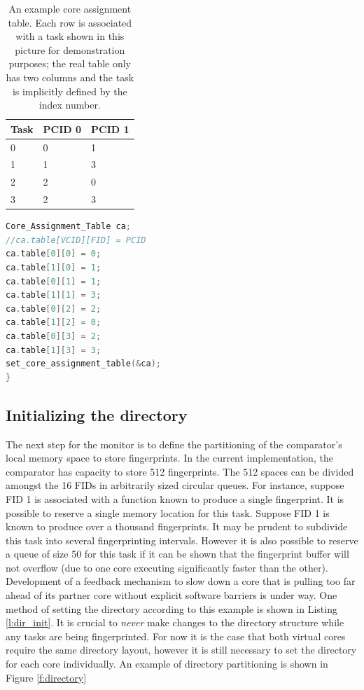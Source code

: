 \begin{table}
\centering
    \begin{tabular}{| l | l | l  |}
    \hline
    Task & PCID 0 & PCID 1\\ \hline
    0 & 0 & 1\\ \hline
    1 & 1 & 3\\ \hline
    2 & 2 & 0\\ \hline
    3 & 2 & 3\\ \hline
    \end{tabular}
    \caption[An example core assignment table.]{An example core assignment table. Each row is associated with a task shown in this picture for demonstration purposes; the real table only has two columns and the task is implicitly defined by the index number. }
    \label{t:cat}
\end{table}


\begin{lstlisting}[frame=single,language=C,label=l:cat,caption=The monitor programs the CAT in the comparator.]
Core_Assignment_Table ca;
//ca.table[VCID][FID] = PCID
ca.table[0][0] = 0;
ca.table[1][0] = 1;
ca.table[0][1] = 1;
ca.table[1][1] = 3;
ca.table[0][2] = 2;
ca.table[1][2] = 0;
ca.table[0][3] = 2;
ca.table[1][3] = 3;
set_core_assignment_table(&ca);
}
\end{lstlisting}

\subsection{Initializing the directory}

The next step for the monitor is to define the partitioning of the comparator's local memory space to store fingerprints. In the current implementation, the comparator has capacity to store 512 fingerprints. The 512 spaces can be divided amongst the 16 FIDs in arbitrarily sized circular queues. For instance, suppose FID 1 is associated with a function known to produce a single fingerprint. It is possible to reserve a single memory location for this task. Suppose FID 1 is known to produce over a thousand fingerprints. It may be prudent to subdivide this task into several fingerprinting intervals. However it is also possible to reserve a queue of size 50 for this task if it can be shown that the fingerprint buffer will not overflow (due to one core executing significantly faster than the other). Development of a feedback mechanism to slow down a core that is pulling too far ahead of its partner core without explicit software barriers is under way. One method of setting the directory according to this example is shown in Listing \ref{l:dir_init}. It is crucial to \emph{never} make changes to the directory structure while any tasks are being fingerprinted. For now it is the case that both virtual cores require the same directory layout, however it is still necessary to set the directory for each core individually. An example of directory partitioning is shown in Figure \ref{f:directory}

